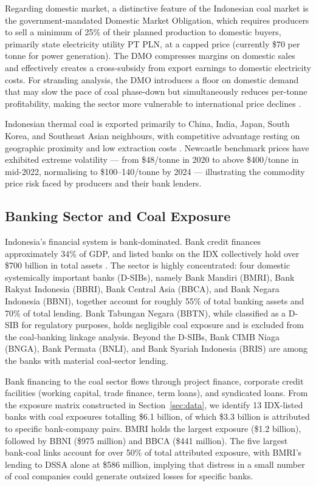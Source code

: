 Regarding domestic market, a distinctive feature of the Indonesian coal market is the government-mandated Domestic Market Obligation, which requires producers to sell a minimum of 25\% of their planned production to domestic buyers, primarily state electricity utility PT PLN, at a capped price (currently \$70 per tonne for power generation). The DMO compresses margins on domestic sales and effectively creates a cross-subsidy from export earnings to domestic electricity costs. For stranding analysis, the DMO introduces a floor on domestic demand that may slow the pace of coal phase-down but simultaneously reduces per-tonne profitability, making the sector more vulnerable to international price declines \citep{Burke2018, Makhijani2015}.

Indonesian thermal coal is exported primarily to China, India, Japan, South Korea, and Southeast Asian neighbours, with competitive advantage resting on geographic proximity and low extraction costs \citep{IEA2023, Mendelevitch2019}. Newcastle benchmark prices have exhibited extreme volatility --- from \$48/tonne in 2020 to above \$400/tonne in mid-2022, normalising to \$100--140/tonne by 2024 --- illustrating the commodity price risk faced by producers and their bank lenders.

\subsection{Banking Sector and Coal Exposure}
\label{subsec:banking_exposure}

Indonesia's financial system is bank-dominated. Bank credit finances approximately 34\% of GDP, and listed banks on the IDX collectively hold over \$700 billion in total assets \citep{IMF2024Indonesia}. The sector is highly concentrated: four domestic systemically important banks (D-SIBs), namely Bank Mandiri (BMRI), Bank Rakyat Indonesia (BBRI), Bank Central Asia (BBCA), and Bank Negara Indonesia (BBNI), together account for roughly 55\% of total banking assets and 70\% of total lending. Bank Tabungan Negara (BBTN), while classified as a D-SIB for regulatory purposes, holds negligible coal exposure and is excluded from the coal-banking linkage analysis. Beyond the D-SIBs, Bank CIMB Niaga (BNGA), Bank Permata (BNLI), and Bank Syariah Indonesia (BRIS) are among the banks with material coal-sector lending.

Bank financing to the coal sector flows through project finance, corporate credit facilities (working capital, trade finance, term loans), and syndicated loans. From the exposure matrix constructed in Section~\ref{sec:data}, we identify 13 IDX-listed banks with coal exposures totalling \$6.1 billion, of which \$3.3 billion is attributed to specific bank-company pairs. BMRI holds the largest exposure (\$1.2 billion), followed by BBNI (\$975 million) and BBCA (\$441 million). The five largest bank-coal links account for over 50\% of total attributed exposure, with BMRI's lending to DSSA alone at \$586 million, implying that distress in a small number of coal companies could generate outsized losses for specific banks.

